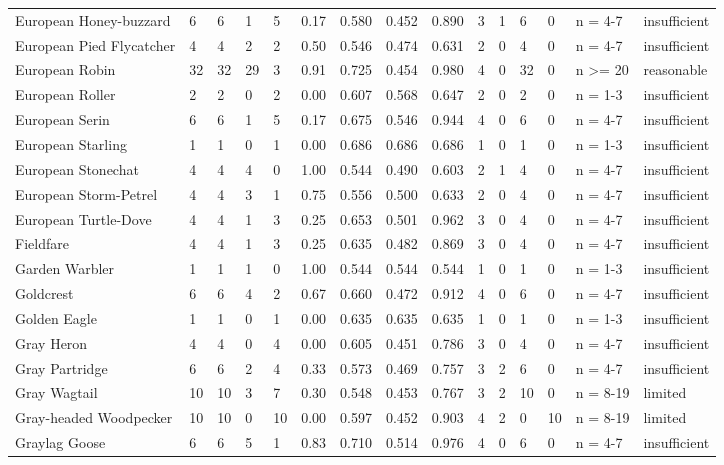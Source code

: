 \begin{landscape}
\begin{longtable}{L{3.6cm}*{12}{C{0.90cm}}L{1.45cm}L{1.65cm}}
European Honey-buzzard & 6 & 6 & 1 & 5 & 0.17 & 0.580 & 0.452 & 0.890 & 3 & 1 & 6 & 0 & n = 4-7 & insufficient \\
European Pied Flycatcher & 4 & 4 & 2 & 2 & 0.50 & 0.546 & 0.474 & 0.631 & 2 & 0 & 4 & 0 & n = 4-7 & insufficient \\
European Robin & 32 & 32 & 29 & 3 & 0.91 & 0.725 & 0.454 & 0.980 & 4 & 0 & 32 & 0 & n >= 20 & reasonable \\
European Roller & 2 & 2 & 0 & 2 & 0.00 & 0.607 & 0.568 & 0.647 & 2 & 0 & 2 & 0 & n = 1-3 & insufficient \\
European Serin & 6 & 6 & 1 & 5 & 0.17 & 0.675 & 0.546 & 0.944 & 4 & 0 & 6 & 0 & n = 4-7 & insufficient \\
European Starling & 1 & 1 & 0 & 1 & 0.00 & 0.686 & 0.686 & 0.686 & 1 & 0 & 1 & 0 & n = 1-3 & insufficient \\
European Stonechat & 4 & 4 & 4 & 0 & 1.00 & 0.544 & 0.490 & 0.603 & 2 & 1 & 4 & 0 & n = 4-7 & insufficient \\
European Storm-Petrel & 4 & 4 & 3 & 1 & 0.75 & 0.556 & 0.500 & 0.633 & 2 & 0 & 4 & 0 & n = 4-7 & insufficient \\
European Turtle-Dove & 4 & 4 & 1 & 3 & 0.25 & 0.653 & 0.501 & 0.962 & 3 & 0 & 4 & 0 & n = 4-7 & insufficient \\
Fieldfare & 4 & 4 & 1 & 3 & 0.25 & 0.635 & 0.482 & 0.869 & 3 & 0 & 4 & 0 & n = 4-7 & insufficient \\
Garden Warbler & 1 & 1 & 1 & 0 & 1.00 & 0.544 & 0.544 & 0.544 & 1 & 0 & 1 & 0 & n = 1-3 & insufficient \\
Goldcrest & 6 & 6 & 4 & 2 & 0.67 & 0.660 & 0.472 & 0.912 & 4 & 0 & 6 & 0 & n = 4-7 & insufficient \\
Golden Eagle & 1 & 1 & 0 & 1 & 0.00 & 0.635 & 0.635 & 0.635 & 1 & 0 & 1 & 0 & n = 1-3 & insufficient \\
Gray Heron & 4 & 4 & 0 & 4 & 0.00 & 0.605 & 0.451 & 0.786 & 3 & 0 & 4 & 0 & n = 4-7 & insufficient \\
Gray Partridge & 6 & 6 & 2 & 4 & 0.33 & 0.573 & 0.469 & 0.757 & 3 & 2 & 6 & 0 & n = 4-7 & insufficient \\
Gray Wagtail & 10 & 10 & 3 & 7 & 0.30 & 0.548 & 0.453 & 0.767 & 3 & 2 & 10 & 0 & n = 8-19 & limited \\
Gray-headed Woodpecker & 10 & 10 & 0 & 10 & 0.00 & 0.597 & 0.452 & 0.903 & 4 & 2 & 0 & 10 & n = 8-19 & limited \\
Graylag Goose & 6 & 6 & 5 & 1 & 0.83 & 0.710 & 0.514 & 0.976 & 4 & 0 & 6 & 0 & n = 4-7 & insufficient \\

\end{longtable}
\end{landscape}
